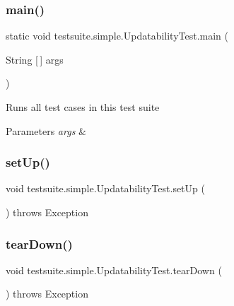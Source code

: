 \subsubsection{\texorpdfstring{main()}{main()}}
{\footnotesize\ttfamily static void testsuite.\+simple.\+Updatability\+Test.\+main (\begin{DoxyParamCaption}\item[{String \mbox{[}$\,$\mbox{]}}]{args }\end{DoxyParamCaption})\hspace{0.3cm}{\ttfamily [static]}}

Runs all test cases in this test suite


\begin{DoxyParams}{Parameters}
{\em args} & \\
\hline
\end{DoxyParams}
\mbox{\label{classtestsuite_1_1simple_1_1_updatability_test_ad7b2d9338b6097dd1b03e99015426f7d}} 
\subsubsection{\texorpdfstring{set\+Up()}{setUp()}}
{\footnotesize\ttfamily void testsuite.\+simple.\+Updatability\+Test.\+set\+Up (\begin{DoxyParamCaption}{ }\end{DoxyParamCaption}) throws Exception}

\mbox{\label{classtestsuite_1_1simple_1_1_updatability_test_add9fa62db68ba414b064d6f89a0cfa6d}} 
\subsubsection{\texorpdfstring{tear\+Down()}{tearDown()}}
{\footnotesize\ttfamily void testsuite.\+simple.\+Updatability\+Test.\+tear\+Down (\begin{DoxyParamCaption}{ }\end{DoxyParamCaption}) throws Exception}

